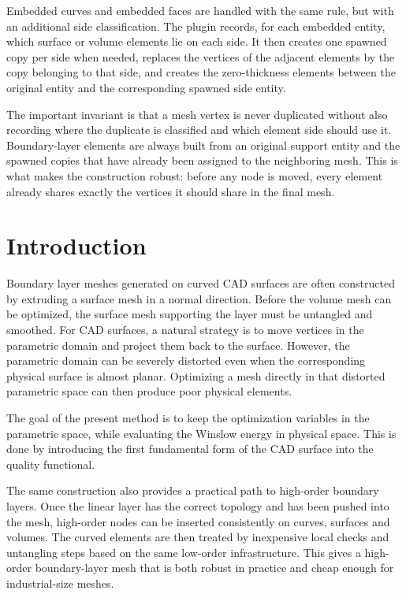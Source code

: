 \documentclass[11pt]{article}
\begin{document}
Embedded curves and embedded faces are handled with the same rule, but with an
additional side classification. The plugin records, for each embedded entity,
which surface or volume elements lie on each side. It then creates one spawned
copy per side when needed, replaces the vertices of the adjacent elements by the
copy belonging to that side, and creates the zero-thickness elements between the
original entity and the corresponding spawned side entity.

The important invariant is that a mesh vertex is never duplicated without also
recording where the duplicate is classified and which element side should use
it. Boundary-layer elements are always built from an original support entity and
the spawned copies that have already been assigned to the neighboring mesh. This
is what makes the construction robust: before any node is moved, every element
already shares exactly the vertices it should share in the final mesh.

\section{Introduction}

Boundary layer meshes generated on curved CAD surfaces are often constructed by
extruding a surface mesh in a normal direction. Before the volume mesh can be
optimized, the surface mesh supporting the layer must be untangled and smoothed.
For CAD surfaces, a natural strategy is to move vertices in the parametric
domain and project them back to the surface. However, the parametric domain can
be severely distorted even when the corresponding physical surface is almost
planar. Optimizing a mesh directly in that distorted parametric space can then
produce poor physical elements.

The goal of the present method is to keep the optimization variables in the
parametric space, while evaluating the Winslow energy in physical space. This is
done by introducing the first fundamental form of the CAD surface into the
quality functional.

The same construction also provides a practical path to high-order boundary
layers. Once the linear layer has the correct topology and has been pushed into
the mesh, high-order nodes can be inserted consistently on curves, surfaces and
volumes. The curved elements are then treated by inexpensive local checks and
untangling steps based on the same low-order infrastructure. This gives a
high-order boundary-layer mesh that is both robust in practice and cheap enough
for industrial-size meshes.
\end{document}
